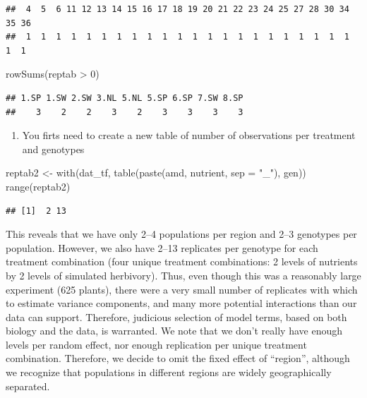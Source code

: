 \documentclass[
  12pt,
]{book}
\newenvironment{Shaded}{\begin{snugshade}}{\end{snugshade}}
\newcommand{\AttributeTok}[1]{\textcolor[rgb]{0.77,0.63,0.00}{#1}}
\newcommand{\DecValTok}[1]{\textcolor[rgb]{0.00,0.00,0.81}{#1}}
\newcommand{\FunctionTok}[1]{\textcolor[rgb]{0.00,0.00,0.00}{#1}}
\newcommand{\NormalTok}[1]{#1}
\newcommand{\OtherTok}[1]{\textcolor[rgb]{0.56,0.35,0.01}{#1}}
\newcommand{\SpecialCharTok}[1]{\textcolor[rgb]{0.00,0.00,0.00}{#1}}
\newcommand{\StringTok}[1]{\textcolor[rgb]{0.31,0.60,0.02}{#1}}
\providecommand{\tightlist}{%
  \setlength{\itemsep}{0pt}\setlength{\parskip}{0pt}}
\begin{document}
\begin{verbatim}
##  4  5  6 11 12 13 14 15 16 17 18 19 20 21 22 23 24 25 27 28 30 34 35 36 
##  1  1  1  1  1  1  1  1  1  1  1  1  1  1  1  1  1  1  1  1  1  1  1  1
\end{verbatim}

\begin{Shaded}
\begin{Highlighting}[]
\FunctionTok{rowSums}\NormalTok{(reptab }\SpecialCharTok{\textgreater{}} \DecValTok{0}\NormalTok{)}
\end{Highlighting}
\end{Shaded}

\begin{verbatim}
## 1.SP 1.SW 2.SW 3.NL 5.NL 5.SP 6.SP 7.SW 8.SP 
##    3    2    2    3    2    3    3    3    3
\end{verbatim}

\begin{enumerate}
\def\labelenumi{\arabic{enumi}.}
\setcounter{enumi}{2}
\tightlist
\item
  You firts need to create a new table of number of observations per treatment and genotypes
\end{enumerate}

\begin{Shaded}
\begin{Highlighting}[]
\NormalTok{reptab2 }\OtherTok{\textless{}{-}} \FunctionTok{with}\NormalTok{(dat\_tf, }\FunctionTok{table}\NormalTok{(}\FunctionTok{paste}\NormalTok{(amd, nutrient, }\AttributeTok{sep =} \StringTok{"\_"}\NormalTok{), gen))}
\FunctionTok{range}\NormalTok{(reptab2)}
\end{Highlighting}
\end{Shaded}

\begin{verbatim}
## [1]  2 13
\end{verbatim}

This reveals that we have only 2--4 populations per region and 2--3 genotypes per population. However, we also have 2--13 replicates per genotype for each treatment combination (four unique treatment combinations: 2 levels of nutrients by 2 levels of simulated herbivory). Thus, even though this was a reasonably large experiment (625 plants), there were a very small number of replicates with which to estimate variance components, and many more potential interactions than our data can support. Therefore, judicious selection of model terms, based on both biology and the data, is warranted. We note that we don't really have enough levels per random effect, nor enough replication per unique treatment combination. Therefore, we decide to omit the fixed effect of ``region'', although we recognize that populations in different regions are widely geographically separated.
\end{document}
